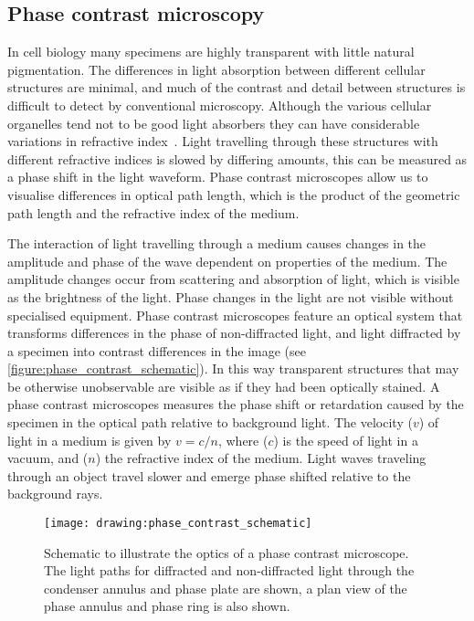 \subsection{Phase contrast microscopy}
\label{introduction:microscopy:phase_contrast_microscopy}
In cell biology many specimens are highly transparent with little natural pigmentation. The differences in light absorption between different cellular structures are minimal, and much of the contrast and detail between structures is difficult to detect by conventional microscopy. Although the various cellular organelles tend not to be good light absorbers they can have considerable variations in refractive index~\cite{Murphy2012}. Light travelling through these structures with different refractive indices is slowed by differing amounts, this can be measured as a phase shift in the light waveform. Phase contrast microscopes allow us to visualise differences in optical path length, which is the product of the geometric path length and the refractive index of the medium. 

The interaction of light travelling through a medium causes changes in the amplitude and phase of the wave dependent on properties of the medium. The amplitude changes occur from scattering and absorption of light, which is visible as the brightness of the light. Phase changes in the light are not visible without specialised equipment. Phase contrast microscopes feature an optical system that transforms differences in the phase of non-diffracted light, and light diffracted by a specimen into contrast differences in the image (see \autoref{figure:phase_contrast_schematic}). In this way transparent structures that may be otherwise unobservable are visible as if they had been optically stained. A phase contrast microscopes measures the phase shift or retardation caused by the specimen in the optical path relative to background light. The velocity ($v$) of light in a medium is given by  $v=c/n$, where ($c$) is the speed of light in a vacuum, and ($n$) the refractive index of the medium. Light waves traveling through an object travel slower and emerge phase shifted relative to the background rays.

\begin{figure}[htbp!]
	\centering
	\texttt{[image: drawing:phase\_contrast\_schematic]}
	\caption[Schematic of phase contrast microscopy optics]{Schematic to illustrate the optics of a phase contrast microscope. The light paths for diffracted and non-diffracted light through the condenser annulus and phase plate are shown, a plan view of the phase annulus and phase ring is also shown.}
	\label{figure:phase_contrast_schematic}
\end{figure}

